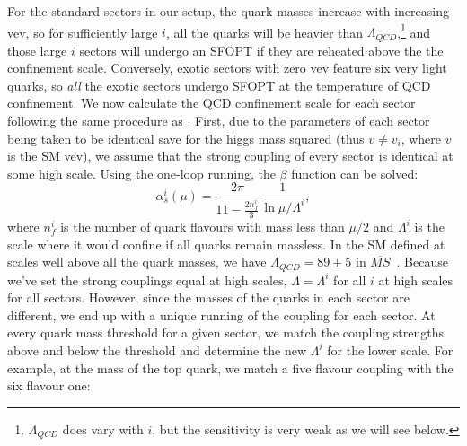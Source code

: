 \documentclass[nofootinbib,twocolumn,preprintnumbers]{revtex4-1}
\begin{document}
%
For the standard sectors in our setup, the quark masses increase with increasing vev, so for sufficiently large $i$, all the quarks will be heavier than $\Lambda_{QCD}$,\footnote{$\Lambda_{QCD}$ does vary with $i$, but the sensitivity is very weak as we will see below.} and those large $i$ sectors will undergo an SFOPT if they are reheated above the the confinement scale. 
Conversely, exotic sectors with zero vev feature six very light quarks, so \textit{all} the exotic sectors undergo SFOPT at the temperature of QCD confinement. 
We now calculate the QCD confinement scale for each sector following the same procedure as \cite{Cui:2011wk}. First, due to the parameters of each sector being taken to be identical save for the higgs mass squared (thus $v \neq v_i$, where $v$ is the SM vev), we assume that the strong coupling of every sector is identical at some high scale. Using the one-loop running, the $\beta$ function can be solved:
\begin{equation}\label{eqn:QCDrunningi}
\alpha_{s}^i (\mu) = \frac{2\pi}{11-\frac{2n^i_f}{3}}\frac{1}{\ln{\mu/\Lambda^i}},
\end{equation}
where $n_f^i$ is the number of quark flavours with mass less than $\mu/2$ and $\Lambda^i$ is the scale where it would confine if all quarks remain massless. In the SM defined at scales well above all the quark masses, we have $\Lambda_{QCD} = 89 \pm 5$ in $\overline{MS}$~\cite{PhysRevD.98.030001}. 
Because we've set the strong couplings equal at high scales, $\Lambda = \Lambda^i$ for all $i$ at high scales for all sectors. However, since the masses of the quarks in each sector are different, we end up with a unique running of the coupling for each sector. At every quark mass threshold for a given sector, we match the coupling strengths above and below the threshold and determine the new $\Lambda^i$ for the lower scale. For example, at the mass of the top quark, we match a five flavour coupling with the six flavour one:
\end{document}
